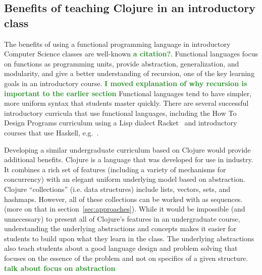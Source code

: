 \documentclass[submission,copyright,creativecommons]{eptcs}
\newcommand{\allcomments}[1]{{#1}}
\newcommand{\elenacomment}[1]{{\bf \textcolor{ForestGreen}{\allcomments{{#1}}}}}
\newcommand{\stephencomment}[1]{{\bf \color{StephensBlue}{\allcomments{{#1}}}}} %
\newcommand{\joecomment}[1]{{\bf \color{JoesGold}{\allcomments{{#1}}}}}
\begin{document}
\subsection{Benefits of teaching Clojure in an introductory class}
The benefits of using a functional programming language in introductory Computer Science classes are well-known  \elenacomment{a citation?}. Functional languages focus on functions as programming units, provide abstraction, generalization, and modularity, and give a better understanding of recursion, one of the key learning goals in an introductory course. 
\elenacomment{I moved explanation of why recursion is important to the earlier section}
Functional languages tend to have simpler, more uniform syntax that students master quickly. There are several successful introductory curricula that use functional languages, including the How To Design Programs curriculum using a Lisp dialect Racket~\cite{htdp} and introductory courses that use Haskell, e.g.~\cite{haskell}.


Developing a similar undergraduate curriculum based on Clojure would provide additional benefits. 
Clojure is a language that was 
developed for use in industry. It combines a rich set of features (including a variety of mechanisms for concurrency) with an elegant uniform underlying model based on abstraction. Clojure ``collections'' (i.e. data structures) include lists, vectors, sets, and hashmaps. However, 
all of these collections can be worked with as sequences. (more on that in section~\ref{sec:approaches}). While it would be impossible (and unnecessary) to present all of Clojure's features in an undergraduate course, understanding the underlying abstractions and concepts makes it easier for students to build upon what they learn in the class.
The underlying abstractions also teach students about a good language design and problem solving that focuses on the essence of the problem and not on specifics of a given structure. \elenacomment{talk about focus on abstraction}
\end{document}
